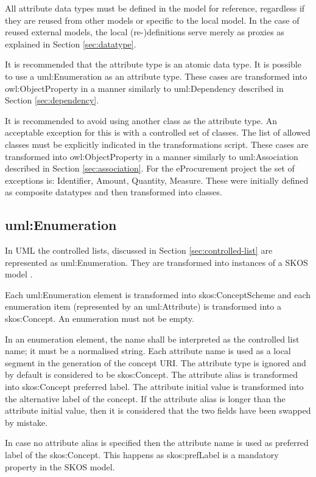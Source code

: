 	All attribute data types must be defined in the model for reference, regardless if they are reused from other models or specific to the local model. In the case of reused external models, the local (re-)definitions serve merely as proxies as explained in Section \ref{sec:datatype}.
	
	It is recommended that the attribute type is an atomic data type. 
	It is possible to use a uml:Enumeration as an attribute type. These cases are transformed into owl:ObjectProperty in a manner similarly to uml:Dependency described in Section \ref{sec:dependency}. 
	
	It is recommended to avoid using another class as the attribute type. An acceptable exception for this is with a controlled set of classes. The list of allowed classes must be explicitly indicated in the transformations script. These cases are transformed into owl:ObjectProperty in a manner similarly to uml:Association described in Section \ref{sec:association}. For the eProcurement project the set of exceptions is: Identifier, Amount, Quantity, Measure. These were initially defined as composite datatypes and then transformed into classes. 
	
	\subsection{uml:Enumeration}
	\label{sec:enumeration}

	In UML the controlled lists, discussed in Section \ref{sec:controlled-list} are represented as uml:Enumeration. They are transformed into instances of a SKOS model \cite{skos-spec}. 
	
	Each uml:Enumeration element is transformed into skos:ConceptScheme and each enumeration item (represented by an uml:Attribute) is transformed into a skos:Concept. An enumeration must not be empty.
	
	In an enumeration element, the name shall be interpreted as the controlled list name; it must be a normalised string. Each attribute name is used as a local segment in the generation of the concept URI. The attribute type is ignored and by default is considered to be skos:Concept. The attribute alias is transformed into skos:Concept preferred label. The attribute initial value is transformed into the alternative label of the concept. If the attribute alias is longer than the attribute initial value, then it is considered that the two fields have been swapped by mistake. 
	
	In case no attribute alias is specified then the attribute name is used as preferred label of the skos:Concept. This happens as skos:prefLabel is a mandatory property in the SKOS model.
	
